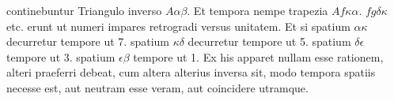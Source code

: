 continebuntur Triangulo inverso $A\alpha\beta$. Et tempora
nempe trapezia $\textit{Af}\kappa\alpha$. $\textit{fg}\delta\kappa$ etc. erunt ut numeri impares retrogradi versus unitatem.
Et si spatium $\alpha\kappa$ decurretur tempore ut 7. spatium $\kappa\delta$ decurretur tempore ut 5.
spatium $\delta\epsilon$ tempore ut 3. spatium $\epsilon\beta$ tempore ut 1.
\pend 
\pstart
Ex his apparet nullam esse rationem,
alteri praeferri debeat, cum altera alterius inversa sit, modo tempora spatiis
necesse est, aut neutram esse veram, aut coincidere
utramque.%
\pend
\count{}
\count{}
\count{}

